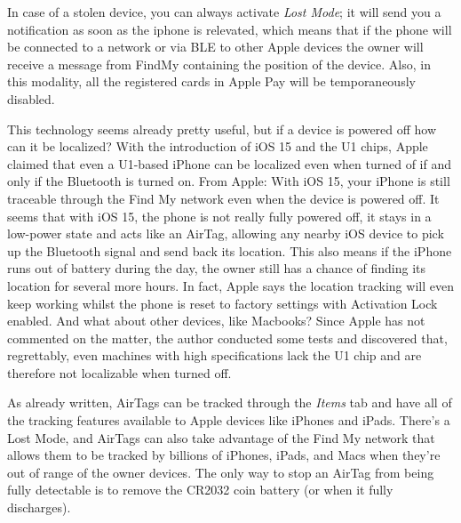 \documentclass[english]{article}
\begin{document}
In case of a stolen device, you can always activate \textit{Lost Mode}; it will send you a notification as soon as the iphone is relevated, which means that if the phone will be connected to a network or via BLE to other Apple devices the owner will receive a message from FindMy containing the position of the device. Also, in this modality, all the registered cards in Apple Pay will be temporaneously disabled.

This technology seems already pretty useful, but if a device is powered off how can it be localized? With the introduction of iOS 15 and the U1 chips, Apple claimed that even a U1-based iPhone can be localized even when turned of if and only if the Bluetooth is turned on. From Apple: With iOS 15, your iPhone is still traceable through the Find My network even when the device is powered off. 
It seems that with iOS 15, the phone is not really fully powered off, it stays in a low-power state and acts like an AirTag, allowing any nearby iOS device to pick up the Bluetooth signal and send back its location.
This also means if the iPhone runs out of battery during the day, the owner still has a chance of finding its location for several more hours. In fact, Apple says the location tracking will even keep working whilst the phone is reset to factory settings with Activation Lock enabled. And what about other devices, like Macbooks? Since Apple has not commented on the matter, the author conducted some tests and discovered that, regrettably, even machines with high specifications lack the U1 chip and are therefore not localizable when turned off. 

As already written, AirTags can be tracked through the \textit{Items} tab and have all of the tracking features available to Apple devices like iPhones and iPads. There's a Lost Mode, and AirTags can also take advantage of the Find My network that allows them to be tracked by billions of iPhones, iPads, and Macs when they're out of range of the owner devices. The only way to stop an AirTag from being fully detectable is to remove the CR2032 coin battery (or when it fully discharges).
\end{document}
